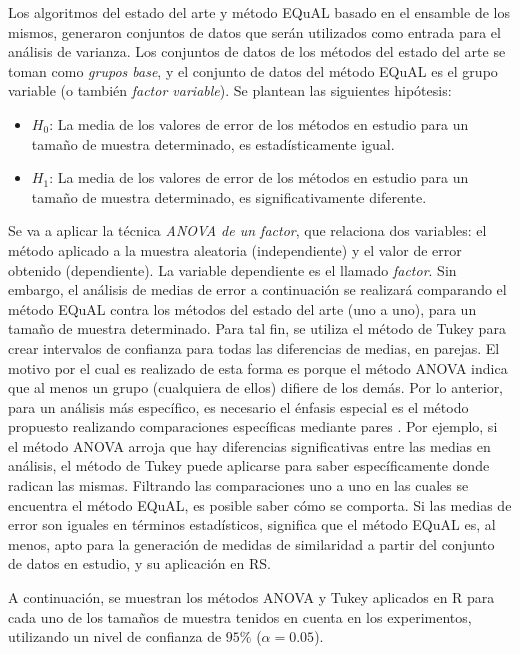 \bigskip Los algoritmos del estado del arte y método EQuAL basado en el ensamble de los mismos, generaron conjuntos de datos que serán utilizados como entrada para el análisis de varianza. Los conjuntos de datos de los métodos del estado del arte se toman como \textit{grupos base}, y el conjunto de datos del método EQuAL es el grupo variable (o también \textit{factor variable}). Se plantean las siguientes hipótesis:
\begin{itemize}
	\item \textbf{\(H_0\)}: La media de los valores de error de los métodos en estudio para un tamaño de muestra determinado, es estadísticamente igual.
	\item \textbf{\(H_1\)}: La media de los valores de error de los métodos en estudio para un tamaño de muestra determinado, es significativamente diferente.
\end{itemize}

\bigskip Se va a aplicar la técnica \textit{ANOVA de un factor}, que relaciona dos variables: el método aplicado a la muestra aleatoria (independiente) y el valor de error obtenido (dependiente). La variable dependiente es el llamado \textit{factor}. Sin embargo, el análisis de medias de error a continuación se realizará comparando el método EQuAL contra los métodos del estado del arte (uno a uno), para un tamaño de muestra determinado. Para tal fin, se utiliza el método de Tukey para crear intervalos de confianza para todas las diferencias de medias, en parejas. El motivo por el cual es realizado de esta forma es porque el método ANOVA indica que al menos un grupo (cualquiera de ellos) difiere de los demás. Por lo anterior, para un análisis más específico, es necesario el énfasis especial es el método propuesto realizando comparaciones específicas mediante pares \citep{abdi2010tukey}. Por ejemplo, si el método ANOVA arroja que hay diferencias significativas entre las medias en análisis, el método de Tukey puede aplicarse para saber específicamente donde radican las mismas. Filtrando las comparaciones uno a uno en las cuales se encuentra el método EQuAL, es posible saber cómo se comporta. Si las medias de error son iguales en términos estadísticos, significa que el método EQuAL es, al menos, apto para la generación de medidas de similaridad a partir del conjunto de datos en estudio, y su aplicación en RS.

\bigskip A continuación, se muestran los métodos ANOVA y Tukey aplicados en R para cada uno de los tamaños de muestra tenidos en cuenta en los experimentos, utilizando un nivel de confianza de \(95\%\) (\(\alpha = 0.05\)).

